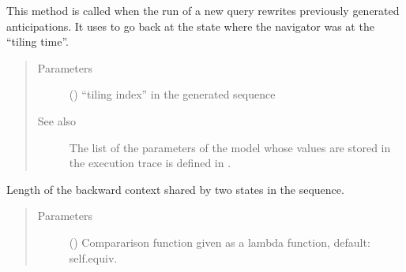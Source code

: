 \documentclass[letterpaper,10pt,english]{sphinxmanual}
\begin{document}
\begin{fulllineitems}
\begin{fulllineitems}
\begin{quote}
\begin{description}
\end{description}\end{quote}

\end{fulllineitems}


\begin{fulllineitems}
\label{\detokenize{index:Navigator.Navigator.go_to_anterior_state_using_execution_trace}}
This method is called when the run of a new query rewrites previously generated anticipations.
It uses  to go back at the state where the navigator was at the “tiling time”.
\begin{quote}\begin{description}
\item[{Parameters}] \leavevmode
{} () \textendash{} “tiling index” in the generated sequence

\item[{See also}] \leavevmode
The list of the parameters of the model whose values are stored in the execution trace is defined in .

\end{description}\end{quote}

\end{fulllineitems}


\begin{fulllineitems}
\label{\detokenize{index:Navigator.Navigator.is_taboo}}
\end{fulllineitems}


\begin{fulllineitems}
\label{\detokenize{index:Navigator.Navigator.length_common_backward_context}}
Length of the backward context shared by two states in the sequence.
\begin{quote}\begin{description}
\item[{Parameters}] \leavevmode
{} () \textendash{} Compararison function given as a lambda function, default: self.equiv.


\end{description}
\end{quote}
\end{fulllineitems}
\end{fulllineitems}
\end{document}
